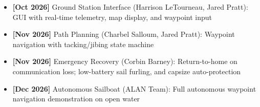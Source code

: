 \begin{itemize}
    \item \textbf{[Oct 2026]} Ground Station Interface (Harrison LeTourneau, Jared Pratt): GUI with real-time telemetry, map display, and waypoint input
    \item \textbf{[Nov 2026]} Path Planning (Charbel Salloum, Jared Pratt): Waypoint navigation with tacking/jibing state machine
    \item \textbf{[Nov 2026]} Emergency Recovery (Corbin Barney): Return-to-home on communication loss; low-battery sail furling, and capsize auto-protection
    \item \textbf{[Dec 2026]} Autonomous Sailboat (ALAN Team): Full autonomous waypoint navigation demonstration on open water
\end{itemize}

